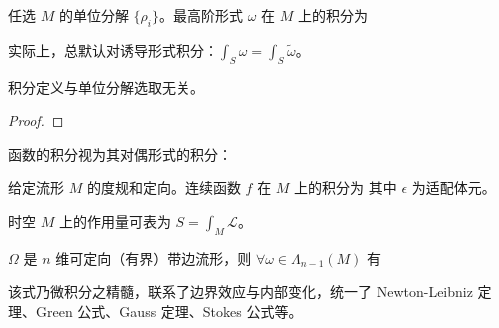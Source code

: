 \begin{definition}
    任选 $M$ 的单位分解 $\{\rho_i\}$。最高阶形式 $\omega$ 在 $M$ 上的积分为
\end{definition}
\begin{remark}
    实际上，总默认对诱导形式积分：$\int_S\omega=\int_S\tilde\omega$。
\end{remark}
\begin{theorem}
    积分定义与单位分解选取无关。
\end{theorem}
\begin{proof}
    
\end{proof}

函数的积分视为其对偶形式的积分：
\begin{definition}
    给定流形 $M$ 的度规和定向。连续函数 $f$ 在 $M$ 上的积分为
    其中 $\epsilon$ 为适配体元。
\end{definition}
\begin{eg}
    时空 $M$ 上的作用量可表为 $S=\int_M\mathcal L$。
\end{eg}

\begin{theorem}[广义Stokes 定理]
    $\Omega$ 是 $n$ 维可定向（有界）带边流形，则 $\forall\omega\in\Lambda_{n-1}(M)$ 有
\end{theorem}
\begin{remark}
    该式乃微积分之精髓，联系了边界效应与内部变化，统一了 Newton-Leibniz 定理、Green 公式、Gauss 定理、Stokes 公式等。
\end{remark}

